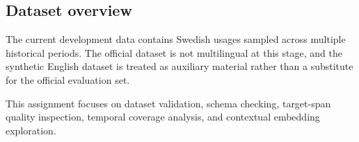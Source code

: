 \subsection{Dataset overview}
The current development data contains Swedish usages sampled across multiple historical periods. The official dataset is not multilingual at this stage, and the synthetic English dataset is treated as auxiliary material rather than a substitute for the official evaluation set.

This assignment focuses on dataset validation, schema checking, target-span quality inspection, temporal coverage analysis, and contextual embedding exploration.
